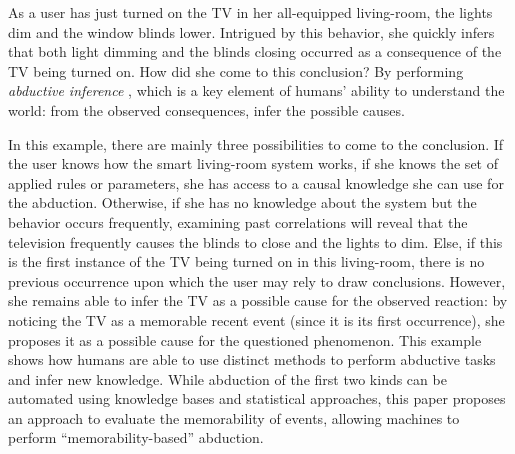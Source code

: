 \documentclass[conference]{IEEEtran}
\begin{document}
As a user has just turned on the TV in her all-equipped living-room, the
lights dim and the window blinds lower. Intrigued by this behavior, she
quickly infers that both light dimming and the blinds closing occurred as a
consequence of the TV being turned on. How did she come to this conclusion?
By performing \emph{abductive inference} \cite{magnani_abduction_2011}, which
is a key element of humans' ability to understand the world: from the
observed consequences, infer the possible causes.

In this example, there are mainly three possibilities to come to the
conclusion. If the user knows how the smart living-room system works, if she
knows the set of applied rules or parameters, she has access to a causal
knowledge she can use for the abduction. Otherwise, if she has no knowledge
about the system but the behavior occurs frequently, examining past
correlations will reveal that the television frequently causes the blinds to
close and the lights to dim. Else, if this is the first instance of the TV
being turned on in this living-room, there is no previous occurrence upon
which the user may rely to draw conclusions. However, she remains able to
infer the TV as a possible cause for the observed reaction: by noticing the
TV as a memorable recent event (since it is its first occurrence), she
proposes it as a possible cause for the questioned phenomenon. This example
shows how humans are able to use distinct methods to perform abductive tasks
and infer new knowledge. While abduction of the first two kinds can be
automated using knowledge bases and statistical approaches, this paper
proposes an approach to evaluate the memorability of events, allowing
machines to perform ``memorability-based'' abduction.





\end{document}
